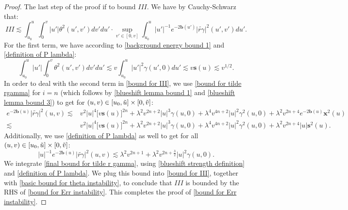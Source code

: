 \documentclass[11pt]{article}
\numberwithin{equation}{section}
\begin{document}
\begin{proof}
    The last step of the proof if to bound $III.$ We have by Cauchy-Schwarz that:
    \begin{equation}\label{bound for III}
        III\lesssim\int_{u_0}^u\int_0^v|u'|\theta^2(u',v')dv'du'\cdot\sup_{v'\in[0,v]}\int_{u_0}^u|u'|^{-1}e^{-2\mathbf{b}(u')}\big|\widetilde{r\gamma}\big|^2(u',v')du'.
    \end{equation}
    For the first term, we have according to \eqref{background energy bound 1} and \eqref{definition of P lambda}:
    \begin{equation}\label{basic bound for theta instability}
        \int_{u_0}^u|u'|\int_0^v\theta^2(u',v')dv'du'\lesssim v\int_{u_0}^u|u'|^2\gamma(u',0)du'\lesssim v\mathbf{s}(u)\lesssim v^{1/2}.
    \end{equation}
    In order to deal with the second term in \eqref{bound for III}, we use \eqref{bound for tilde rgamma} for $i=n$ (which follows by \eqref{blueshift lemma bound 1} and \eqref{blueshift lemma bound 3}) to get for $(u,v)\in[u_0,\Tilde{u}]\times[0,\Tilde{v}]$:
    \begin{align*}
        e^{-2\mathbf{b}(u)}\big|\widetilde{r\gamma}\big|^2(u,v)\lesssim & v^2|u|^4\big[v\mathbf{s}(u)\big]^{2n}+\lambda^2 v^{2n+2}|u|^3\gamma(u,0)+\lambda^4v^{4n+2}|u|^2\gamma^2(u,0)+\lambda^2v^{2n+4}e^{-2\mathbf{b}(u)}\mathbf{x}^2(u)\\
        \lesssim & v^2|u|^4\big[v\mathbf{s}(u)\big]^{2n}+\lambda^2 v^{2n+2}|u|^3\gamma(u,0)+\lambda^4v^{4n+2}|u|^2\gamma^2(u,0)+\lambda^2v^{2n+4}|u|\mathbf{s}^2(u).
    \end{align*}
    Additionally, we use \eqref{definition of P lambda} as well to get for all $(u,v)\in[u_0,\Tilde{u}]\times[0,\Tilde{v}]$:
    \begin{equation}\label{final bound for tilde r gamma}
        |u|^{-1}e^{-2\mathbf{b}(u)}\big|\widetilde{r\gamma}\big|^2(u,v)\lesssim \lambda^2v^{2n+1}+\lambda^2 v^{2n+\frac{3}{2}}|u|^2\gamma(u,0).
    \end{equation}
    We integrate \eqref{final bound for tilde r gamma}, using \eqref{blueshift strength definition} and \eqref{definition of P lambda}. We plug this bound into \eqref{bound for III}, together with \eqref{basic bound for theta instability}, to conclude that $III$ is bounded by the RHS of \eqref{bound for Err instability}. This completes the proof of \eqref{bound for Err instability}.
\end{proof}
\end{document}
